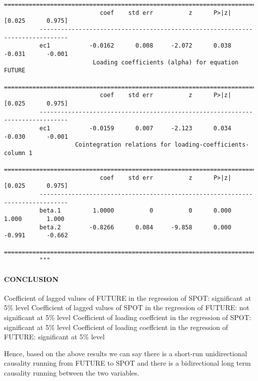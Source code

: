 \documentclass[11pt]{article}
\begin{document}
\begin{Verbatim}[commandchars=\\\{\}]
          ==============================================================================
                           coef    std err          z      P>|z|      [0.025      0.975]
          ------------------------------------------------------------------------------
          ec1           -0.0162      0.008     -2.072      0.038      -0.031      -0.001
                         Loading coefficients (alpha) for equation FUTURE               
          ==============================================================================
                           coef    std err          z      P>|z|      [0.025      0.975]
          ------------------------------------------------------------------------------
          ec1           -0.0159      0.007     -2.123      0.034      -0.030      -0.001
                    Cointegration relations for loading-coefficients-column 1           
          ==============================================================================
                           coef    std err          z      P>|z|      [0.025      0.975]
          ------------------------------------------------------------------------------
          beta.1         1.0000          0          0      0.000       1.000       1.000
          beta.2        -0.8266      0.084     -9.858      0.000      -0.991      -0.662
          ==============================================================================
          """
\end{Verbatim}
            
    \paragraph{CONCLUSION}\label{conclusion}

    Coefficient of lagged values of FUTURE in the regression of SPOT:
significant at 5\% level Coefficient of lagged values of SPOT in the
regression of FUTURE: not significant at 5\% level Coefficient of
loading coeffcient in the regression of SPOT: significant at 5\% level
Coefficient of loading coeffcient in the regression of FUTURE:
significant at 5\% level

Hence, based on the above results we can say there is a short-run
unidirectional causality running from FUTURE to SPOT and there is a
bidirectional long term causality running between the two variables.


    
    
    
    
\end{document}
